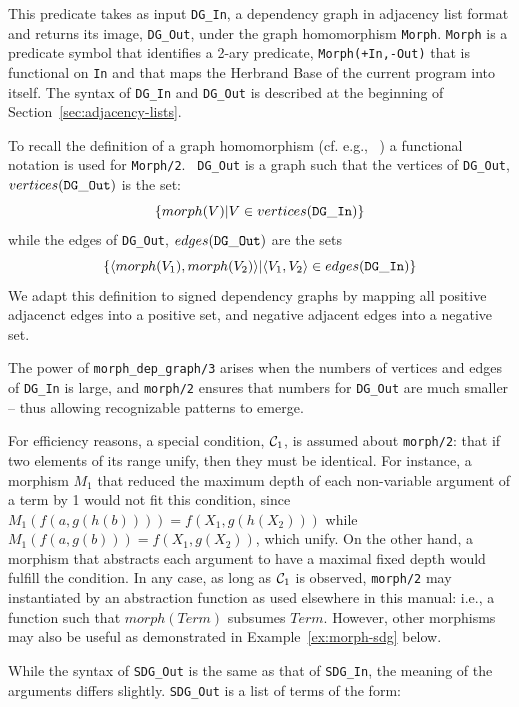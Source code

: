 \begin{description}
%
This predicate takes as input {\tt DG\_In}, a dependency graph in
adjacency list format and returns its image, {\tt DG\_Out}, under the
graph homomorphism {\tt Morph}.  {\tt Morph} is a predicate symbol
that identifies a 2-ary predicate, {\tt Morph(+In,-Out)} that is
functional on {\tt In} and that maps the Herbrand Base of the current
program into itself.  The syntax of {\tt DG\_In} and {\tt DG\_Out} is
described at the beginning of Section~\ref{sec:adjacency-lists}.

To recall the definition of a graph homomorphism (cf. e.g.,
~\cite{Hara69}) a functional notation is used for {\tt Morph/2}.  {\tt
  DG\_Out} is a graph such that the vertices of {\tt DG\_Out},
$vertices({\tt DG\_Out})$ is the set:
\[
\{ morph(V) | V \in vertices({\tt DG\_In}) \}
\]
while the edges of {\tt DG\_Out}, $edges({\tt DG\_Out})$ are the sets
\[
\{ \langle morph(V_1),morph(V_2) \rangle | \langle V_1,V_2 \rangle \in edges({\tt DG\_In}) \}
\]
We adapt this definition to signed dependency graphs by mapping all
positive adjacenct edges into a positive set, and negative adjacent
edges into a negative set.

The power of {\tt morph\_dep\_graph/3} arises when the numbers of
vertices and edges of {\tt DG\_In} is large, and {\tt morph/2} ensures
that numbers for {\tt DG\_Out} are much smaller -- thus allowing
recognizable patterns to emerge.

For efficiency reasons, a special condition, ${\cal C}_1$, is assumed
  about {\tt morph/2}: that if two elements of its range unify, then
  they must be identical.  For instance, a morphism $M_1$ that reduced
  the maximum depth of each non-variable argument of a term by 1 would
  not fit this condition, since $M_1(f(a,g(h(b)))) = f(X_1,g(h(X_2)))$
  while $M_1(f(a,g(b))) = f(X_1,g(X_2))$, which unify.  On the other
  hand, a morphism that abstracts each argument to have a maximal
  fixed depth would fulfill the condition.  In any case, as long as
  ${\cal C}_1$ is observed, {\tt morph/2} may instantiated by an
  abstraction function as used elsewhere in this manual: i.e., a
  function such that $morph(Term)$ subsumes $Term$.  However, other
  morphisms may also be useful as demonstrated in
  Example~\ref{ex:morph-sdg} below.

While the syntax of {\tt SDG\_Out} is the same as that of {\tt SDG\_In},
the meaning of the arguments differs slightly.  {\tt SDG\_Out} is a
list of terms of the form:


\end{description}
